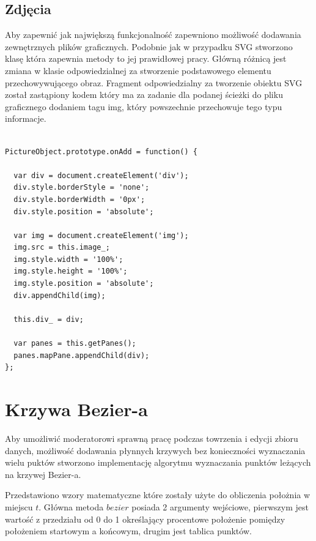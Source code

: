 \subsection{Zdjęcia}
\label{subsec:pictures}

Aby zapewnić jak największą funkcjonalność zapewniono możliwość dodawania zewnętrznych plików graficznych.
Podobnie jak w przypadku SVG stworzono klasę która zapewnia metody to jej prawidłowej pracy. Główną różnicą jest zmiana w klasie odpowiedzialnej za stworzenie podstawowego elementu przechowywującego obraz. Fragment odpowiedzialny za tworzenie obiektu SVG został zastąpiony kodem który ma za zadanie dla podanej ścieżki do pliku graficznego dodaniem tagu img, który powszechnie przechowuje tego typu informacje.

\lstset{language=JavaScript}
\begin{lstlisting}[label={lst:svgImpl},caption={Klasa do obsługi SVG}]

PictureObject.prototype.onAdd = function() {

  var div = document.createElement('div');
  div.style.borderStyle = 'none';
  div.style.borderWidth = '0px';
  div.style.position = 'absolute';

  var img = document.createElement('img');
  img.src = this.image_;
  img.style.width = '100%';
  img.style.height = '100%';
  img.style.position = 'absolute';
  div.appendChild(img);

  this.div_ = div;

  var panes = this.getPanes();
  panes.mapPane.appendChild(div);
};

\end{lstlisting}


\section{Krzywa Bezier-a}
\label{sec:bezierimpl}

Aby umożliwić moderatorowi sprawną pracę podczas towrzenia i edycji zbioru danych, możliwość dodawania płynnych krzywych bez konieczności wyznaczania wielu puktów stworzono implementację algorytmu wyznaczania punktów leżących na krzywej Bezier-a.

Przedstawiono wzory matematyczne które zostały użyte do obliczenia położnia w miejscu $t$. Główna metoda $bezier$ posiada 2 argumenty wejściowe, pierwszym jest wartość z przedziału od 0 do 1 określający procentowe położenie pomiędzy położeniem  startowym a końcowym, drugim jest tablica punktów.

